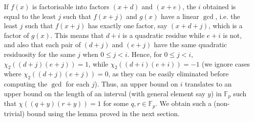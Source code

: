\documentclass{report}
\begin{document}
If $f(x)$ is factorisable into factors $(x+d)$ and $(x+e)$, the $i$ obtained is equal to the least $j$ such that $f(x+j)$ and $g(x)$ have a linear $\gcd$, i.e. the least $j$ such that $f(x+j)$ has exactly one factor, say $(x+d+j)$, which is a factor of  $g(x)$. This means that $d+i$ is a quadratic residue while $e+i$ is not, and also that each pair of $(d+j)$ and $(e+j)$ have the same quadratic residuosity for the same $j$ when $0\leq j<i$. Hence, for $0\leq j<i$, $\chi_2((d+j)(e+j))=1$, while $\chi_2((d+i)(e+i))=-1$ (we ignore cases where $\chi_2((d+j)(e+j))=0$, as they can be easily eliminated before computing the $\gcd$ for each $j$). Thus, an upper bound on $i$ translates to an upper bound on the length of an interval (with general element say $y$) in $\mathbb{F}_p$ such that $\chi((q+y)(r+y))=1$ for some $q,r\in \mathbb{F}_p$. We obtain such a (non-trivial) bound using the lemma proved in the next section.
%
%
\end{document}
